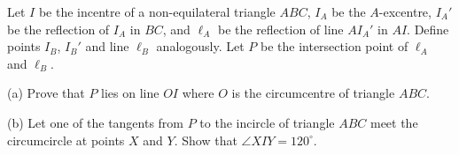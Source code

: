 Let $I$ be the incentre of a non-equilateral triangle $ABC$, $I_A$ be the $A$-excentre, $I_A'$ be the reflection of $I_A$ in $BC$, and $\ell_A$ be the reflection of line $AI_A'$ in $AI$. Define points $I_B$, $I_B'$ and line $\ell_B$ analogously. Let $P$ be the intersection point of $\ell_A$ and $\ell_B$.

\medskip

(a) Prove that $P$ lies on line $OI$ where $O$ is the circumcentre of triangle $ABC$.

\medskip

(b) Let one of the tangents from $P$ to the incircle of triangle $ABC$ meet the circumcircle at points $X$ and $Y$. Show that $\angle XIY = 120^{\circ}$.
